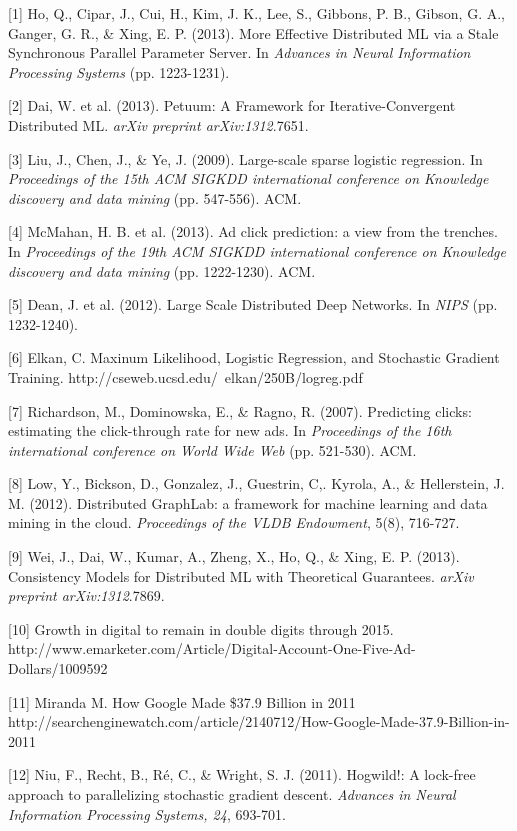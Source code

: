 \documentclass{article} %
\begin{document}
\small{
[1] Ho, Q., Cipar, J., Cui, H., Kim, J. K., Lee, S., Gibbons, P. B., Gibson, G. A., Ganger, G. R., \& Xing, E. P. (2013). More Effective Distributed ML via a Stale Synchronous Parallel Parameter Server. In {\it Advances in Neural Information Processing Systems} (pp. 1223-1231).

[2] Dai, W. et al. (2013). Petuum: A Framework for Iterative-Convergent Distributed ML. {\it arXiv preprint arXiv:1312}.7651.

[3] Liu, J., Chen, J., \& Ye, J. (2009). Large-scale sparse logistic regression. In {\it Proceedings of the 15th ACM SIGKDD international conference on Knowledge discovery and data mining} (pp. 547-556). ACM.

[4] McMahan, H. B. et al. (2013). Ad click prediction: a view from the trenches. In {\it Proceedings of the 19th ACM SIGKDD international conference on Knowledge discovery and data mining} (pp. 1222-1230). ACM.

[5] Dean, J. et al. (2012). Large Scale Distributed Deep Networks. In {\it NIPS} (pp. 1232-1240).

[6] Elkan, C. Maxinum Likelihood, Logistic Regression, and Stochastic Gradient Training. http://cseweb.ucsd.edu/~elkan/250B/logreg.pdf

[7] Richardson, M., Dominowska, E., \& Ragno, R. (2007). Predicting clicks: estimating the click-through rate for new ads. In {\it Proceedings of the 16th international conference on World Wide Web} (pp. 521-530). ACM.

[8] Low, Y., Bickson, D., Gonzalez, J., Guestrin, C,. Kyrola, A., \& Hellerstein, J. M. (2012). Distributed GraphLab: a framework for machine learning and data mining in the cloud. {\it Proceedings of the VLDB Endowment}, 5(8), 716-727.

[9] Wei, J., Dai, W., Kumar, A., Zheng, X., Ho, Q., \& Xing, E. P. (2013). Consistency Models for Distributed ML with Theoretical Guarantees. {\it arXiv preprint arXiv:1312}.7869.

[10] Growth in digital to remain in double digits through 2015. http://www.emarketer.com/Article/Digital-Account-One-Five-Ad-Dollars/1009592

[11] Miranda M. How Google Made \$37.9 Billion in 2011 http://searchenginewatch.com/article/2140712/How-Google-Made-37.9-Billion-in-2011

[12] Niu, F., Recht, B., Ré, C., \& Wright, S. J. (2011). Hogwild!: A lock-free approach to parallelizing stochastic gradient descent. {\it Advances in Neural Information Processing Systems, 24}, 693-701.

}
\end{document}
